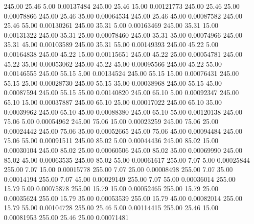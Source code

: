     245.00     25.46      5.00     0.00137484
    245.00     25.46     15.00     0.00121773
    245.00     25.46     25.00     0.00078866
    245.00     25.46     35.00     0.00064534
    245.00     25.46     45.00     0.00087582
    245.00     25.46     55.00     0.00130261
    245.00     35.31      5.00     0.00163469
    245.00     35.31     15.00     0.00131322
    245.00     35.31     25.00     0.00078460
    245.00     35.31     35.00     0.00074966
    245.00     35.31     45.00     0.00103589
    245.00     35.31     55.00     0.00149393
    245.00     45.22      5.00     0.00164838
    245.00     45.22     15.00     0.00115651
    245.00     45.22     25.00     0.00054781
    245.00     45.22     35.00     0.00053062
    245.00     45.22     45.00     0.00095566
    245.00     45.22     55.00     0.00146555
    245.00     55.15      5.00     0.00134524
    245.00     55.15     15.00     0.00076431
    245.00     55.15     25.00     0.00028730
    245.00     55.15     35.00     0.00038968
    245.00     55.15     45.00     0.00087594
    245.00     55.15     55.00     0.00140820
    245.00     65.10      5.00     0.00092347
    245.00     65.10     15.00     0.00037887
    245.00     65.10     25.00     0.00017022
    245.00     65.10     35.00     0.00039962
    245.00     65.10     45.00     0.00088380
    245.00     65.10     55.00     0.00120138
    245.00     75.06      5.00     0.00054962
    245.00     75.06     15.00     0.00023259
    245.00     75.06     25.00     0.00024442
    245.00     75.06     35.00     0.00052665
    245.00     75.06     45.00     0.00094484
    245.00     75.06     55.00     0.00091511
    245.00     85.02      5.00     0.00044436
    245.00     85.02     15.00     0.00030104
    245.00     85.02     25.00     0.00060506
    245.00     85.02     35.00     0.00069990
    245.00     85.02     45.00     0.00063535
    245.00     85.02     55.00     0.00061617
    255.00      7.07      5.00     0.00025844
    255.00      7.07     15.00     0.00015778
    255.00      7.07     25.00     0.00008498
    255.00      7.07     35.00     0.00014194
    255.00      7.07     45.00     0.00029149
    255.00      7.07     55.00     0.00036014
    255.00     15.79      5.00     0.00075878
    255.00     15.79     15.00     0.00052465
    255.00     15.79     25.00     0.00035624
    255.00     15.79     35.00     0.00053539
    255.00     15.79     45.00     0.00082014
    255.00     15.79     55.00     0.00104728
    255.00     25.46      5.00     0.00114415
    255.00     25.46     15.00     0.00081953
    255.00     25.46     25.00     0.00071481
